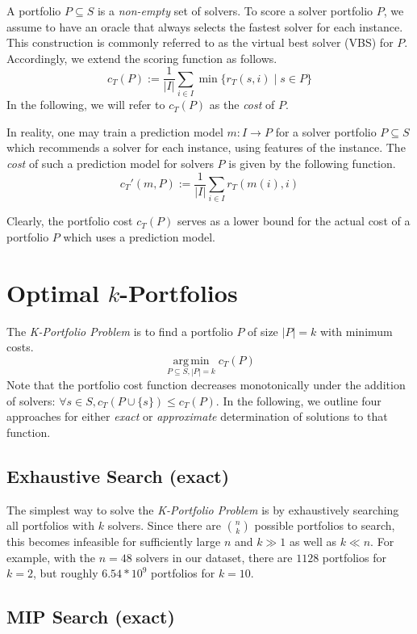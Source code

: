 \documentclass[conference]{IEEEtran}
\DeclareMathOperator*{\argmin}{arg\,min}
\begin{document}
A portfolio $P \subseteq S$ is a \emph{non-empty} set of solvers.
To score a solver portfolio $P$, we assume to have an oracle that always selects the fastest solver for each instance. 
This construction is commonly referred to as the virtual best solver (VBS) for $P$. 
Accordingly, we extend the scoring function as follows.%
$$
	c_{T}(P) := \frac{1}{|I|} \sum\limits_{i \in I}{\min\{r_T(s,i) \mid s \in P\}}
$$
In the following, we will refer to $c_{T}(P)$ as the \emph{cost} of $P$. 

In reality, one may train a prediction model $m : I \rightarrow P$ for a solver portfolio $P \subseteq S$ which recommends a solver for each instance, using features of the instance. 
The \emph{cost} of such a prediction model for solvers $P$ is given by the following function.%
$$
	c_{T}'(m,P) := \frac{1}{|I|} \sum\limits_{i \in I}{r_T(m(i),i)}
$$

Clearly, the portfolio cost $c_{T}(P)$ serves as a lower bound for the actual cost of a portfolio $P$ which uses a prediction model.

\section{Optimal $k$-Portfolios}
\label{sec:approach}

The \emph{K-Portfolio Problem} is to find a portfolio $P$ of size $|P| = k$ with minimum costs.%
$$
\argmin\limits_{P \subseteq S, |P| = k} c_{T}(P)
$$
Note that the portfolio cost function decreases monotonically under the addition of solvers: $\forall s \in S, c_{T}(P \cup \{s\}) \leq c_{T}(P)$. 
In the following, we outline four approaches for either \emph{exact} or \emph{approximate} determination of solutions to that function. 

\subsection{Exhaustive Search (exact)}

The simplest way to solve the \emph{K-Portfolio Problem} is by exhaustively searching all portfolios with $k$ solvers. 
Since there are $\binom{n}{k}$ possible portfolios to search, this becomes infeasible for sufficiently large $n$ and $k \gg 1$ as well as $k \ll n$.
For example, with the $n=48$ solvers in our dataset, there are $1128$ portfolios for $k=2$, but roughly $6.54 * 10^9$ portfolios for $k=10$.

\subsection{MIP Search (exact)}
\end{document}
